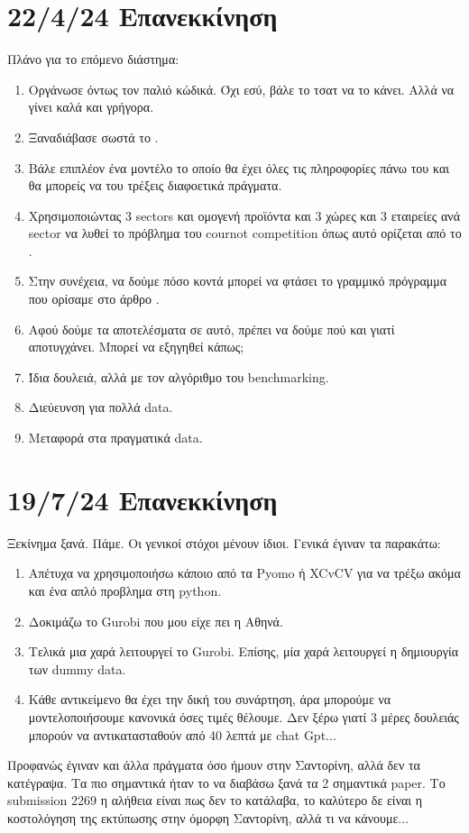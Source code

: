 \documentclass[a4paper,twoside,10pt]{article}
\begin{document}
\section{22/4/24 Επανεκκίνηση}
Πλάνο για το επόμενο διάστημα:
\begin{enumerate}
	\item Οργάνωσε όντως τον παλιό κώδικά. Όχι εσύ, βάλε το τσατ να το κάνει. Αλλά να γίνει καλά και γρήγορα. 
	\item Ξαναδιάβασε σωστά το \cite{Allocating}.
	\item Βάλε επιπλέον ένα μοντέλο το οποίο θα έχει όλες τις πληροφορίες πάνω του και θα μπορείς να του τρέξεις διαφοετικά πράγματα. 
	\item Χρησιμοποιώντας 3 sectors και ομογενή προϊόντα και 3 χώρες και 3 εταιρείες ανά sector να λυθεί το πρόβλημα του cournot competition όπως αυτό ορίζεται από το \cite{Allocating}.
	\item Στην συνέχεια, να δούμε πόσο κοντά μπορεί να φτάσει το γραμμικό πρόγραμμα που ορίσαμε στο άρθρο \cite{First}. 
	\item Αφού δούμε τα αποτελέσματα σε αυτό, πρέπει να δούμε πού και γιατί αποτυγχάνει. Μπορεί να εξηγηθεί κάπως;
	\item Ίδια δουλειά, αλλά με τον αλγόριθμο του benchmarking. 
	\item Διεύευνση για πολλά data.
	\item Μεταφορά στα πραγματικά data. 
\end{enumerate}

\section{19/7/24 Επανεκκίνηση}
Ξεκίνημα ξανά. Πάμε. Οι γενικοί στόχοι μένουν ίδιοι. Γενικά έγιναν τα παρακάτω:
\begin{enumerate}
	\item Απέτυχα να χρησιμοποιήσω κάποιο από τα Pyomo ή XCvCV για να τρέξω ακόμα και ένα απλό προβλημα στη python.
	\item Δοκιμάζω το Gurobi που μου είχε πει η Αθηνά. 
	\item Τελικά μια χαρά λειτουργεί το Gurobi. Επίσης, μία χαρά λειτουργεί η δημιουργία των dummy data. 
	\item Κάθε αντικείμενο θα έχει την δική του συνάρτηση, άρα μπορούμε να μοντελοποιήσουμε κανονικά όσες τιμές θέλουμε. Δεν ξέρω γιατί 3 μέρες δουλειάς μπορούν να αντικατασταθούν από 40 λεπτά με chat Gpt...
\end{enumerate}
Προφανώς έγιναν και άλλα πράγματα όσο ήμουν στην Σαντορίνη, αλλά δεν τα κατέγραψα. Τα πιο σημαντικά ήταν το να διαβάσω ξανά τα 2 σημαντικά paper. Το submission 2269 η αλήθεια είναι πως δεν το κατάλαβα, το καλύτερο δε είναι η κοστολόγηση της εκτύπωσης στην όμορφη Σαντορίνη, αλλά τι να κάνουμε...
\end{document}

